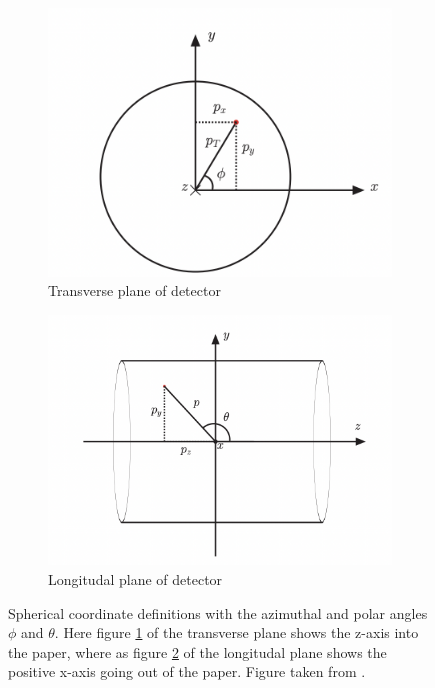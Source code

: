 \begin{figure}[H]
    \centering
    \begin{subfigure}{.45\textwidth}
        \includegraphics[width=\textwidth]{Figures/atlas/transverse_plane.png}
        \caption{Transverse plane of detector}
        \label{fig:transverse_plane}
    \end{subfigure}
    \hfill
    \begin{subfigure}{.45\textwidth}
        \includegraphics[width=\textwidth]{Figures/atlas/longitudal_plane.png}
        \caption{Longitudal plane of detector}
        \label{fig:longitudal_plane}
    \end{subfigure}
    \hfill
    \caption[ATLAS detector longitudal and azimuthal diagrams]{Spherical coordinate definitions with the azimuthal and polar angles $\phi$ and $\theta$. Here figure \ref{fig:transverse_plane} of the transverse plane shows the z-axis
     into the paper, where as figure \ref{fig:longitudal_plane} of the longitudal plane shows the positive x-axis going out of the paper. Figure taken from \cite{Gramstad:1631043}.}
    \label{fig:long_trans_plane}
\end{figure}

